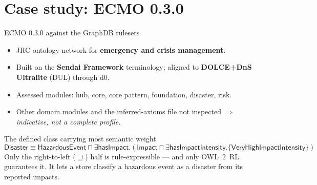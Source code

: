 \documentclass[10pt,aspectratio=169,xcolor=table]{beamer}
\newcommand{\cn}[1]{\mathsf{#1}}
\newcommand{\rn}[1]{\mathsf{#1}}
\newcommand{\ind}[1]{\mathsf{#1}}
\newcommand{\eqv}{\equiv}
\begin{document}
\section{Case study: ECMO 0.3.0}

\begin{frame}{ECMO 0.3.0 against the GraphDB rulesets}
  \begin{itemize}
    \item JRC ontology network for \textbf{emergency and crisis management}.
    \item Built on the \textbf{Sendai Framework} terminology; aligned to
      \textbf{DOLCE+DnS Ultralite} (DUL) through d0.
    \item Assessed modules: hub, core, core pattern, foundation, disaster, risk.
    \item Other domain modules and the inferred-axioms file not inspected
      $\Rightarrow$ \emph{indicative, not a complete profile}.
  \end{itemize}
  \vspace{0.5em}
  \begin{block}{The defined class carrying most semantic weight}
    \[
      \cn{Disaster} \eqv \cn{HazardousEvent} \sqcap
      \exists \rn{hasImpact}.(\cn{Impact} \sqcap
      \exists \rn{hasImpactIntensity}.\{\ind{VeryHighImpactIntensity}\})
    \]
    \small Only the right-to-left ($\sqsupseteq$) half is rule-expressible --- and only
    OWL~2~RL guarantees it. It lets a store classify a hazardous event as a disaster
    from its reported impacts.
  \end{block}
\end{frame}
\end{document}

